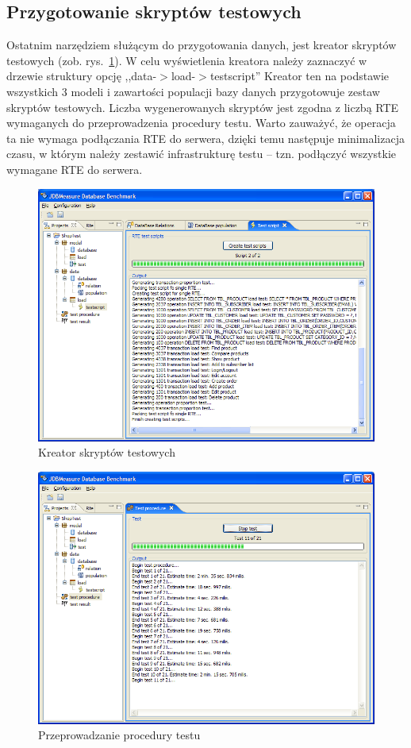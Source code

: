 \subsection{Przygotowanie skryptów testowych}
Ostatnim narzędziem służącym do przygotowania danych, jest kreator skryptów testowych (zob. rys.~\ref{rys:testscriptscreator}).
W celu wyświetlenia kreatora należy zaznaczyć w drzewie struktury opcję ,,data-$>$load-$>$testscript''
Kreator ten na podstawie wszystkich 3 modeli i zawartości populacji bazy danych
przygotowuje zestaw skryptów testowych. Liczba wygenerowanych skryptów jest zgodna z liczbą RTE wymaganych
do przeprowadzenia procedury testu. Warto zauważyć, że operacja ta nie wymaga 
podłączania RTE do serwera, dzięki temu następuje minimalizacja czasu, w którym 
należy zestawić infrastrukturę testu -- tzn. podłączyć wszystkie wymagane RTE do serwera.
\begin{figure}[h]
\begin{center}
\includegraphics[width=0.9\linewidth]{figures/gui/23.png}
\end{center}
\caption{Kreator skryptów testowych}\label{rys:testscriptscreator}
\end{figure}

\begin{figure}[!h]
\begin{center}
\includegraphics[width=0.9\linewidth]{figures/gui/28.png}
\end{center}
\caption{Przeprowadzanie procedury testu}\label{rys:testprocedure}
\end{figure}

